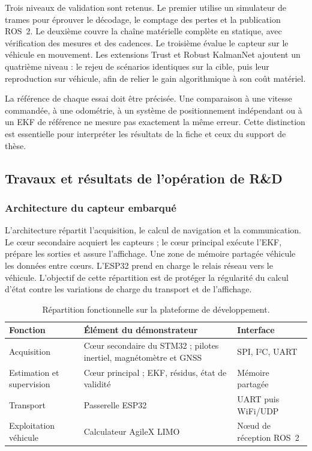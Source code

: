 Trois niveaux de validation sont retenus. Le premier utilise un simulateur de trames pour éprouver le décodage, le comptage des pertes et la publication ROS~2. Le deuxième couvre la chaîne matérielle complète en statique, avec vérification des mesures et des cadences. Le troisième évalue le capteur sur le véhicule en mouvement. Les extensions Trust et Robust KalmanNet ajoutent un quatrième niveau : le rejeu de scénarios identiques sur la cible, puis leur reproduction sur véhicule, afin de relier le gain algorithmique à son coût matériel.

La référence de chaque essai doit être précisée. Une comparaison à une vitesse commandée, à une odométrie, à un système de positionnement indépendant ou à un EKF de référence ne mesure pas exactement la même erreur. Cette distinction est essentielle pour interpréter les résultats de la fiche et ceux du support de thèse.

\subsection{Travaux et résultats de l'opération de R\&D}

\subsubsection{Architecture du capteur embarqué}

L'architecture répartit l'acquisition, le calcul de navigation et la communication. Le cœur secondaire acquiert les capteurs ; le cœur principal exécute l'EKF, prépare les sorties et assure l'affichage. Une zone de mémoire partagée véhicule les données entre cœurs. L'ESP32 prend en charge le relais réseau vers le véhicule. L'objectif de cette répartition est de protéger la régularité du calcul d'état contre les variations de charge du transport et de l'affichage.

\begin{table}[!htbp]\centering\small
\begin{tabularx}{\linewidth}{|L{3.5cm}|Y|L{3.5cm}|}\hline
{}\textbf{Fonction} & \textbf{Élément du démonstrateur} & \textbf{Interface}\\\hline
Acquisition & Cœur secondaire du STM32 ; pilotes inertiel, magnétomètre et GNSS & SPI, I²C, UART\\\hline
Estimation et supervision & Cœur principal ; EKF, résidus, état de validité & Mémoire partagée\\\hline
Transport & Passerelle ESP32 & UART puis WiFi/UDP\\\hline
Exploitation véhicule & Calculateur AgileX LIMO & Nœud de réception ROS~2\\\hline
\end{tabularx}
\caption{Répartition fonctionnelle sur la plateforme de développement.}
\end{table}

